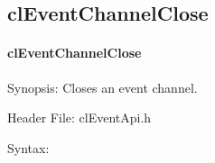 \begin{flushleft}
\subsection{clEventChannelClose}
\hypertarget{pageem105}{}\paragraph{cl\-Event\-Channel\-Close}\label{pageem105}
\begin{Desc}
\item[Synopsis:]Closes an event channel.\end{Desc}
\begin{Desc}
\item[Header File:]clEventApi.h\end{Desc}
\begin{Desc}
\item[Syntax:]


\end{Desc}
\end{flushleft}
